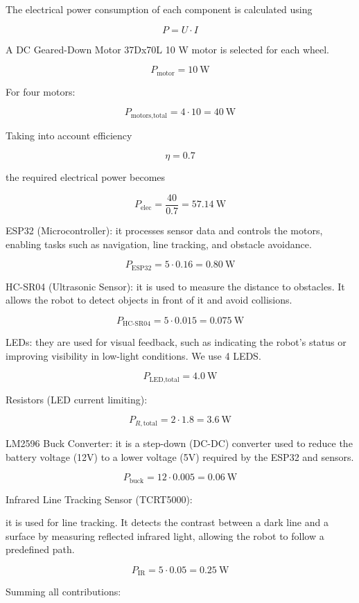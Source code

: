 \documentclass{article}
\begin{document}
The electrical power consumption of each component is calculated using

\[
P = U \cdot I
\]

A DC Geared-Down Motor 37Dx70L 10 W motor is selected for each wheel.

\[
P_{\text{motor}} = 10\ \text{W}
\]


For four motors:

\[
P_{\text{motors,total}} = 4 \cdot 10 = 40\ \text{W}
\]

Taking into account efficiency

\[
\eta = 0.7
\]

the required electrical power becomes

\[
P_{\text{elec}} = \frac{40}{0.7} = 57.14\ \text{W}
\]


ESP32 (Microcontroller):
it processes sensor data and controls the motors, enabling tasks such as navigation, line tracking, and obstacle avoidance.

\[
P_{\text{ESP32}} = 5 \cdot 0.16 = 0.80\ \text{W}
\]

HC-SR04 (Ultrasonic Sensor):
it is used to measure the distance to obstacles. It allows the robot to detect objects in front of it and avoid collisions.

\[
P_{\text{HC-SR04}} = 5 \cdot 0.015 = 0.075\ \text{W}
\]

LEDs:
they are used for visual feedback, such as indicating the robot’s status or improving visibility in low-light conditions. We use 4 LEDS.

\[
P_{\text{LED,total}} = 4.0\ \text{W}
\]

Resistors (LED current limiting):

\[
P_{R,\text{total}} = 2 \cdot 1.8 = 3.6\ \text{W}
\]

LM2596 Buck Converter:
it is a step-down (DC-DC) converter used to reduce the battery voltage (12V) to a lower voltage (5V) required by the ESP32 and sensors.

\[
P_{\text{buck}} = 12 \cdot 0.005 = 0.06\ \text{W}
\]

Infrared Line Tracking Sensor (TCRT5000):

it is used for line tracking. It detects the contrast between a dark line and a surface by measuring reflected infrared light, allowing the robot to follow a predefined path.

\[
P_{\text{IR}} = 5 \cdot 0.05 = 0.25\ \text{W}
\]


Summing all contributions:
\end{document}
